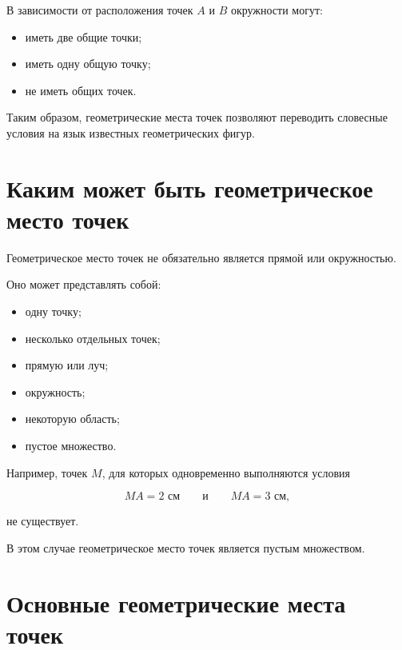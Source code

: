 	\gmtcirclesintersectionfigure

		В зависимости от расположения точек \(A\) и \(B\) окружности могут:
		
		\begin{itemize}
			\item иметь две общие точки;
			\item иметь одну общую точку;
			\item не иметь общих точек.
		\end{itemize}
		
		Таким образом, геометрические места точек позволяют переводить словесные
		условия на язык известных геометрических фигур.
	
	\section{Каким может быть геометрическое место точек}
	
	Геометрическое место точек не обязательно является прямой или окружностью.
	
	Оно может представлять собой:
	
	\begin{itemize}
		\item одну точку;
		\item несколько отдельных точек;
		\item прямую или луч;
		\item окружность;
		\item некоторую область;
		\item пустое множество.
	\end{itemize}
	
	Например, точек \(M\), для которых одновременно выполняются условия
	
	\[
	MA=2\text{ см}
	\qquad\text{и}\qquad
	MA=3\text{ см},
	\]
	
	не существует.
	
	В этом случае геометрическое место точек является пустым множеством.
	
	\section{Основные геометрические места точек}
	
	\renewcommand{\arraystretch}{1.5}
	

